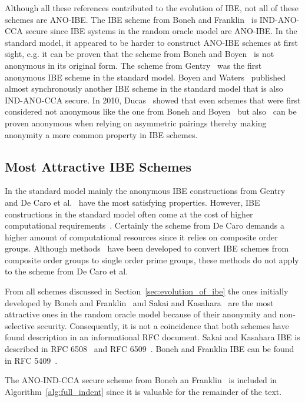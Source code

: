 Although all these references contributed to the evolution of IBE, not all of these schemes are ANO-IBE. The IBE scheme from Boneh and Franklin~\cite{art:BonehF01} is IND-ANO-CCA secure since IBE systems in the random oracle model are ANO-IBE. In the standard model, it appeared to be harder to construct ANO-IBE schemes at first sight, e.g. it can be proven that the scheme from Boneh and Boyen~\cite{art:BonehB04} is not anonymous in its original form. The scheme from Gentry~\cite{art:Gentry06} was the first anonymous IBE scheme in the standard model. Boyen and Waters~\cite{art:BoyenW06} published almost synchronously another IBE scheme in the standard model that is also IND-ANO-CCA secure. In 2010, Ducas~\cite{art:Ducas10} showed that even schemes that were first considered not anonymous like the one from Boneh and Boyen~\cite{art:BonehB04} but also~\cite{art:BonehBG05,art:Waters05} can be proven anonymous when relying on asymmetric pairings thereby making anonymity a more common property in IBE schemes.

\subsection{Most Attractive IBE Schemes}
In the standard model mainly the anonymous IBE constructions from Gentry~\cite{art:Gentry06} and De Caro et al.~\cite{art:CaroIP10} have the most satisfying properties. However, IBE constructions in the standard model often come at the cost of higher computational requirements~\cite{art:Boyen08}. Certainly the scheme from De Caro demands a higher amount of computational resources since it relies on composite order groups. Although methods~\cite{art:Freeman10,art:Lewko12} have been developed to convert IBE schemes from composite order groups to single order prime groups, these methods do not apply to the scheme from De Caro et al.~\cite{art:LeeL10}

From all schemes discussed in Section~\ref{sec:evolution_of_ibe} the ones initially developed by Boneh and Franklin~\cite{art:BonehF01} and Sakai and Kasahara~\cite{art:SakaiK03} are the most attractive ones in the random oracle model because of their anonymity and non-selective security. Consequently, it is not a coincidence that both schemes have found description in an informational RFC document. Sakai and Kasahara IBE is described in RFC 6508~\cite{rfc6508} and RFC 6509~\cite{rfc6509}. Boneh and Franklin IBE can be found in RFC 5409~\cite{rfc5409}. 

The ANO-IND-CCA secure scheme from Boneh an Franklin~\cite{art:BonehF01} is included in Algorithm~\ref{alg:full_indent} since it is valuable for the remainder of the text.

